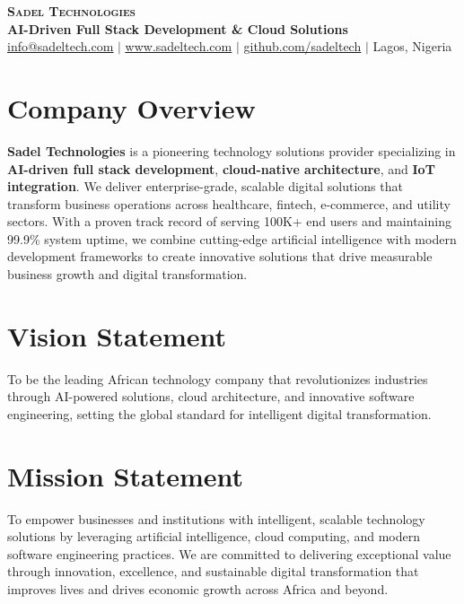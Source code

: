 \documentclass[letterpaper,11pt]{article}
\begin{document}
\begin{center}
    \textbf{\Huge \scshape Sadel Technologies} \\ \vspace{1pt}
    \textbf{\large AI-Driven Full Stack Development \& Cloud Solutions} \\ \vspace{5pt}
    \small \href{mailto:info@sadeltech.com}{\underline{info@sadeltech.com}} $|$ 
    \href{https://sadeltech.com}{\underline{www.sadeltech.com}} $|$
    \href{https://github.com/sadeltech}{\underline{github.com/sadeltech}} $|$
    Lagos, Nigeria
\end{center}

\section{Company Overview}
\begin{itemize}[leftmargin=0.15in, label={}]
    \small{\item{
        \textbf{Sadel Technologies} is a pioneering technology solutions provider specializing in \textbf{AI-driven full stack development}, \textbf{cloud-native architecture}, and \textbf{IoT integration}. We deliver enterprise-grade, scalable digital solutions that transform business operations across healthcare, fintech, e-commerce, and utility sectors. With a proven track record of serving 100K+ end users and maintaining 99.9\% system uptime, we combine cutting-edge artificial intelligence with modern development frameworks to create innovative solutions that drive measurable business growth and digital transformation.
    }}
\end{itemize}

\section{Vision Statement}
\begin{itemize}[leftmargin=0.15in, label={}]
    \small{\item{
        To be the leading African technology company that revolutionizes industries through AI-powered solutions, cloud architecture, and innovative software engineering, setting the global standard for intelligent digital transformation.
    }}
\end{itemize}

\section{Mission Statement}
\begin{itemize}[leftmargin=0.15in, label={}]
    \small{\item{
        To empower businesses and institutions with intelligent, scalable technology solutions by leveraging artificial intelligence, cloud computing, and modern software engineering practices. We are committed to delivering exceptional value through innovation, excellence, and sustainable digital transformation that improves lives and drives economic growth across Africa and beyond.
    }}
\end{itemize}
\end{document}
